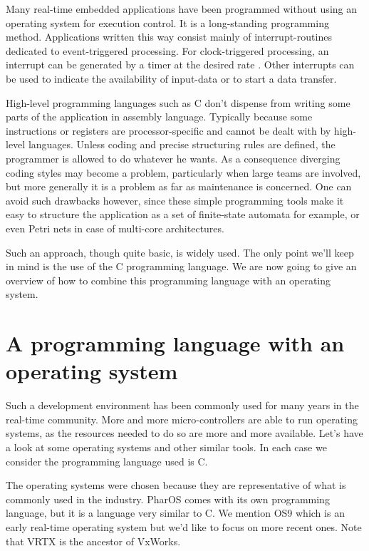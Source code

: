\documentclass[10pt]{report}
\begin{document}
Many real-time embedded applications have been programmed without
using an operating system for execution control. It is a long-standing 
programming method. Applications written this way consist mainly of 
interrupt-routines dedicated to event-triggered processing. 
For clock-triggered processing, an interrupt can be generated by a timer 
at the desired rate . Other interrupts can be used to indicate the availability 
of input-data or to start a data transfer.

High-level programming languages such as C don't dispense from
writing some parts of the application in assembly language.
Typically because some instructions or registers are
processor-specific and cannot be dealt with by high-level
languages. Unless coding and precise structuring rules are
defined, the programmer is allowed to do whatever he wants. As a
consequence diverging coding styles may become a problem,
particularly when large teams are involved, but more generally it is a 
problem as far as maintenance is concerned. One can avoid such drawbacks
however, since these simple programming tools make it easy to
structure the application as a set of finite-state automata for
example, or even Petri nets in case of multi-core architectures.

Such an approach, though quite basic, is widely used. The only
point we'll keep in mind is the use of the C programming
language. We are now going to give an overview of how to combine
this programming language with an operating system.


\section{A programming language with an operating system}

Such a development environment has been commonly used for many
years in the real-time community. More and more micro-controllers
are able to run operating systems, as the resources needed to do
so are more and more available. Let's have a look at some
operating systems and other similar tools. In each case we
consider the programming language used is C.

The operating systems were chosen because they are representative of what is
commonly used in the industry. PharOS comes with its own
programming language, but it is a language very similar to C. We
mention OS9 which is an early real-time operating system but we'd
like to focus on more recent ones. Note that VRTX is the ancestor
of VxWorks.
\end{document}
